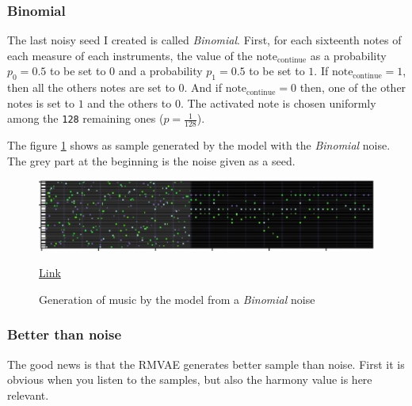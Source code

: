 \documentclass[12pt]{report}
\begin{document}
\subsubsection{Binomial}

The last noisy seed I created is called \textit{Binomial}.
First, for each sixteenth notes of each measure of each instruments, the value of the $\text{note}_{\text{continue}}$ as a probability $p_0=0.5$ to be set to $0$ and a probability $p_1=0.5$ to be set to $1$.
If $\text{note}_{\text{continue}} = 1$, then all the others notes are set to $0$.
And if $\text{note}_{\text{continue}} = 0$ then, one of the other notes is set to $1$ and the others to $0$.
The activated note is chosen uniformly among the \texttt{128} remaining ones ($p=\frac{1}{128}$).

The figure \ref{fig:task:noise:binomial} shows as sample generated by the model with the \textit{Binomial} noise.
The grey part at the beginning is the noise given as a seed.

\begin{figure}[htbp]
    \centering
    \includegraphics[width=\textwidth]{images/generated_midis/tasks/generate-noise/generate-noise-binary.jpg}
    \caption{Generation of music by the model from a \textit{Binomial} noise}
    \href{https://github.com/ValentinVignal/midiGenerator/blob/master/samples/tasks/generated_noise_binary.mid}{Link}
    \label{fig:task:noise:binomial}
\end{figure}

\subsubsection{Better than noise}

The good news is that the RMVAE generates better sample than noise.
First it is obvious when you listen to the samples, but also the harmony value is here relevant.
\end{document}

